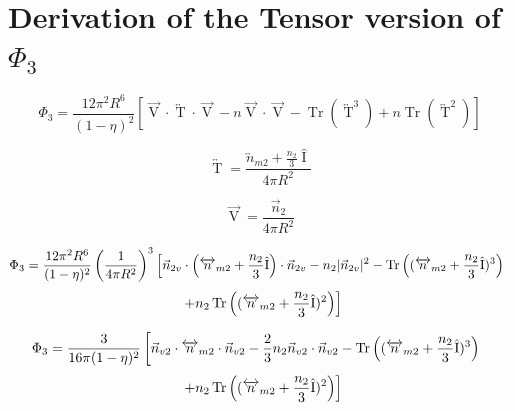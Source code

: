 \documentclass[double,12pt]{beavtex}
\begin{document}
\section{Derivation of the Tensor version of $\Phi_3$}

\begin{equation}{\Phi_3=\frac{12\pi^2R^6}{(1-\eta)^2}\left[\overrightarrow{\operatorname{V}}\cdot\overleftrightarrow{\operatorname{T}}\cdot\overrightarrow{\operatorname{V}}-n\overrightarrow{\operatorname{V}}\cdot\overrightarrow{\operatorname{V}}-\operatorname{Tr}\left(\overleftrightarrow{\operatorname{T}}^3\right)+n\operatorname{Tr}\left(\overleftrightarrow{\operatorname{T}}^2\right)\right]}\end{equation}

\begin{equation}{\overleftrightarrow{\operatorname{T}}=\frac{{\overleftrightarrow{n}_{m2}}+\frac{n_2}{3}\hat{\operatorname{I}}}{4\pi{R}^2}}\end{equation}

\begin{equation}{\overrightarrow{\operatorname{V}}=\frac{\vec{n}_2}{4\pi{R}^2}}\end{equation}

\begin{displaymath}{\Phi_3=\frac{12\pi^2R^6}{(1-\eta)^2}\left(\frac{1}{4\pi{R}^2}\right)^3\left[\vec{n}_{2v}\cdot\left({\overleftrightarrow{n}_{m2}}+\frac{n_2}{3}\hat{\operatorname{I}}\right)\cdot\vec{n}_{2v}-n_2|\vec{n}_{2v}|^2-\operatorname{Tr}\left(({\overleftrightarrow{n}_{m2}}+\frac{n_2}{3}\hat{\operatorname{I}})^3\right)\color{white}\right]\color{black}}\end{displaymath}
\begin{equation}{\color{white}\left[\color{black}+n_2\operatorname{Tr}\left(({\overleftrightarrow{n}_{m2}}+\frac{n_2}{3}\hat{\operatorname{I}})^2\right)\right]}\end{equation}

\begin{displaymath}{\Phi_3=\frac{3}{16\pi(1-\eta)^2}\left[\vec{n}_{v2}\cdot{\overleftrightarrow{n}_{m2}}\cdot{\vec{n}_{v2}}-\frac{2}{3}n_2\vec{n}_{v2}\cdot\vec{n}_{v2}-\operatorname{Tr}\left(({\overleftrightarrow{n}_{m2}}+\frac{n_2}{3}\hat{\operatorname{I}})^3\right)\color{white}\right]\color{black}}\end{displaymath}
\begin{equation}{\color{white}\left[\color{black}+n_2\operatorname{Tr}\left((\overleftrightarrow{n}_{m2}+\frac{n_2}{3}\hat{\operatorname{I}})^2\right)\right]}\end{equation}
\end{document}
